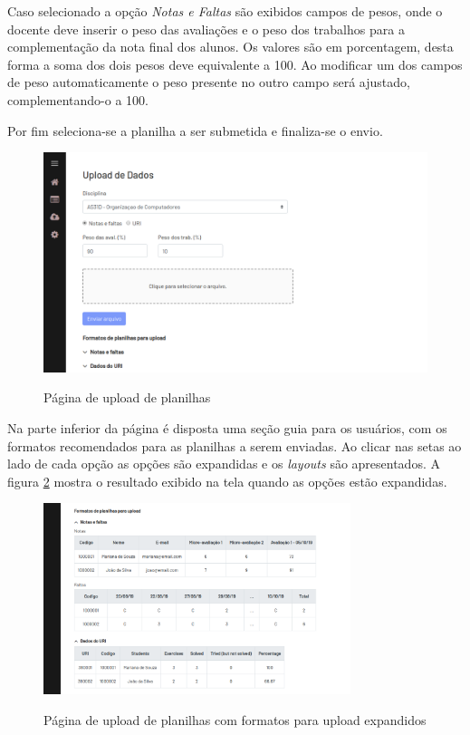 Caso selecionado a opção \textit{Notas e Faltas} são exibidos campos de pesos, onde o docente deve inserir o peso das avaliações e o peso dos trabalhos para a complementação da nota final dos alunos. 
Os valores são em porcentagem, desta forma a soma dos dois pesos deve equivalente a 100. 
Ao modificar um dos campos de peso automaticamente o peso presente no outro campo será ajustado, complementando-o a 100.

Por fim seleciona-se a planilha a ser submetida e finaliza-se o envio.

\begin{figure}[!htb]
    \centering
    \caption{Página de upload de planilhas}
    \includegraphics[width=1\textwidth]{./dados/figuras/sistema/sistema-upload-1}
    \label{fig:sistema-upload-1}
\end{figure}

Na parte inferior da página é disposta uma seção guia para os usuários, com os formatos recomendados para as planilhas a serem enviadas. Ao clicar nas setas ao lado de cada opção as opções são expandidas e os \textit{layouts} são apresentados.
A figura \ref{fig:sistema-upload-2} mostra o resultado exibido na tela quando as opções estão expandidas.

\begin{figure}[!htb]
    \centering
    \caption{Página de upload de planilhas com formatos para upload expandidos}
    \includegraphics[width=0.8\textwidth]{./dados/figuras/sistema/sistema-upload-2}
    \label{fig:sistema-upload-2}
\end{figure}

